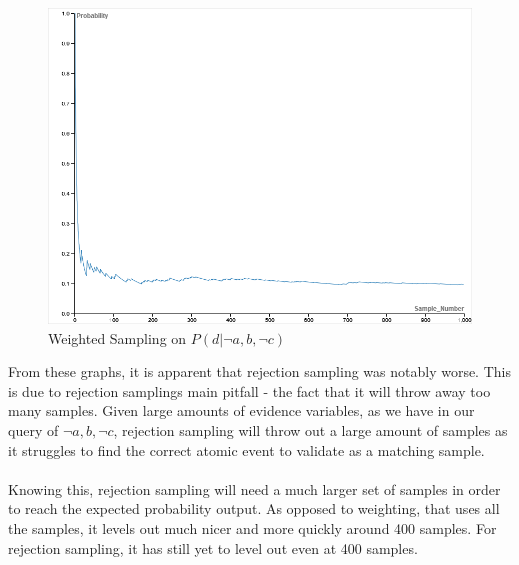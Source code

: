 \documentclass{article}
\begin{document}
\begin{enumerate}[a)]
        \begin{figure}[H]
            \centering
            \includegraphics[width=\linewidth]{images/weighted_sampling_ourquery.png}
            \caption{Weighted Sampling on $P(d|\neg a,b, \neg c)$}
            \label{fig:newquery_weighted_graph}
        \end{figure}
        From these graphs, it is apparent that rejection sampling was notably worse. This is due
        to rejection samplings main pitfall - the fact that it will throw away too many samples.
        Given large amounts of evidence variables, as we have in our query of $\neg a, b, \neg c$, 
        rejection sampling will throw out a large amount of samples as it struggles to find the correct
        atomic event to validate as a matching sample.\\\\
        Knowing this, rejection sampling will need a much 
        larger set of samples in order to reach the expected probability output. As opposed to weighting, 
        that uses all the samples, it levels out much nicer and more quickly around 400 samples. 
        For rejection sampling, it has still yet to level out even at 400 samples.
\end{enumerate}

\clearpage
\end{document}

